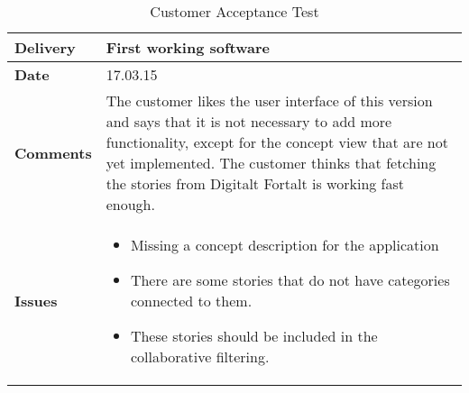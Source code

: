 			\renewcommand{\arraystretch}{2}%
			\begin{center}
				\begin{longtable}{ | p{4cm} | p{13cm} | }
					
					\caption[Customer Acceptance test]{Customer Acceptance Test } \label{Tab:cattest3}\\
					\hline
					\textbf{Delivery} & First working software\\ \hline
					\textbf{Date} & 17.03.15 \\ \hline
					\textbf{Comments} & The customer likes the user interface of this version and says that it is not necessary to add more functionality, except for the concept view that are not yet implemented. The customer thinks that fetching the stories from Digitalt Fortalt is working fast enough.  \\ \hline			
					\textbf{Issues} & 
					\begin{itemize}[noitemsep]
						
						\item Missing a concept description for the application 
						\item There are some stories that do not have categories connected to them. 
						\item These stories should be included in the collaborative filtering.
					\end{itemize}
					\\ \hline		
				\end{longtable}
			\end{center}
			
